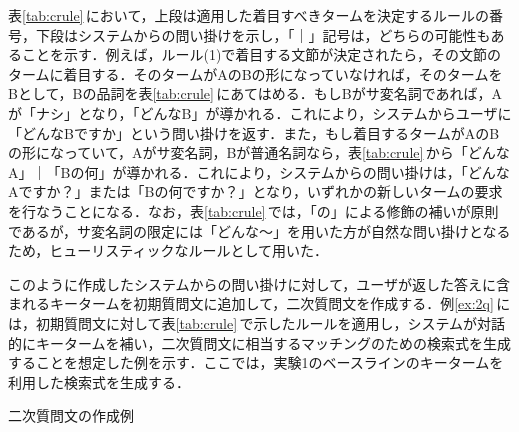 表\ref{tab:crule}\,において，上段は適用した着目すべきタームを決定するルールの番号，下段はシステムからの問い掛けを示し，「｜」記号は，どちらの可能性もあることを示す．例えば，ルール(1)で着目する文節が決定されたら，その文節のタームに着目する．そのタームがAのBの形になっていなければ，そのタームをBとして，Bの品詞を表\ref{tab:crule}\,にあてはめる．もしBがサ変名詞であれば，Aが「ナシ」となり，「どんなB」が導かれる．これにより，システムからユーザに「どんなBですか」という問い掛けを返す．また，もし着目するタームがAのBの形になっていて，Aがサ変名詞，Bが普通名詞なら，表\ref{tab:crule}\,から「どんなA」｜「Bの何」が導かれる．これにより，システムからの問い掛けは，「どんなAですか？」または「Bの何ですか？」となり，いずれかの新しいタームの要求を行なうことになる．なお，表\ref{tab:crule}\,では，「の」による修飾の補いが原則であるが，サ変名詞の限定には「どんな〜」を用いた方が自然な問い掛けとなるため，ヒューリスティックなルールとして用いた．

このように作成したシステムからの問い掛けに対して，ユーザが返した答えに含まれるキータームを初期質問文に追加して，二次質問文を作成する．例\ref{ex:2q}\,には，初期質問文に対して表\ref{tab:crule}\,で示したルールを適用し，システムが対話的にキータームを補い，二次質問文に相当するマッチングのための検索式を生成することを想定した例を示す．ここでは，実験1のベースラインのキータームを利用した検索式を生成する． 

\begin{example}[ht]
 \begin{center}
 \end{center}
 \caption{二次質問文の作成例}
 \label{ex:2q}
\end{example}

